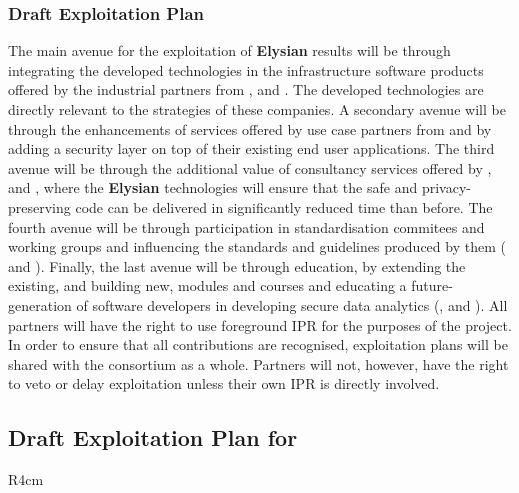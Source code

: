 \documentclass[a4paper,11pt]{article}
\newcommand{\project}[1]{\textbf{#1}\xspace}
\newcommand{\SECURITY}{\project{Elysian}}
\newcommand{\TheProject}{\SECURITY}
\begin{document}

\subsubsection{Draft Exploitation Plan}
\label{sect:exploitation-plan}
\vspace{-12pt}
The main avenue for the exploitation of \TheProject{} results will be through integrating the developed technologies in the infrastructure software products offered by the industrial partners from \IBMshort{}, \YAGshort{} and \COGNIshort{}. The developed technologies are directly relevant to the strategies of these companies. A secondary avenue will be through the enhancements of services offered by use case partners from \SOPRAshort{} and \FRQshort{} by adding a security layer on top of their existing end user applications. The third avenue will be through the additional value of consultancy services offered by \SOPRAshort{}, \SCCHshort{} and \UODshort{}, where the \TheProject{} technologies will ensure that the safe and privacy-preserving code can be delivered in significantly reduced time than before. The fourth avenue will be through participation in standardisation commitees and working groups and influencing the standards and guidelines produced by them (\UCMshort{} and \FRQshort{}). Finally, the last avenue will be through education, by extending the existing, and building new, modules and courses and educating a future-generation of software developers in developing secure data analytics (\SAshort{}, \UODshort{} and \UCMshort{}). All partners will have the right to use foreground IPR for the purposes of the project. In order to ensure that all contributions are recognised, exploitation plans will be shared with the consortium as a whole. Partners will not, however, have the right to veto or delay exploitation unless their own IPR is directly involved.


\horizontalline

\subsection*{Draft Exploitation Plan for \IBMshort{}}

\begin{wrapfigure}{R}{4cm}
\vspace{-1.4cm}
\hfill {}
\vspace{-0.6cm}
\end{wrapfigure}
\end{document}
